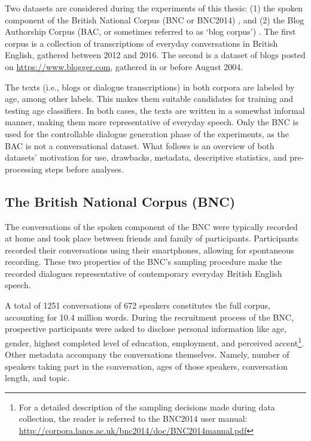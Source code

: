 Two datasets are considered during the experiments of this thesis: (1) the spoken component of the British National Corpus (BNC or BNC2014) \citep{love-spoken-bnc-2014}, and (2) the Blog Authorship Corpus (BAC, or sometimes referred to as `blog corpus') \citep{schler2006effects}. The first corpus is a collection of transcriptions of everyday conversations in British English, gathered between 2012 and 2016. The second is a dataset of blogs posted on \url{https://www.blogger.com}, gathered in or before August 2004.

The texts (i.e., blogs or dialogue transcriptions) in both corpora are labeled by age, among other labels. This makes them suitable candidates for training and testing age classifiers. In both cases, the texts are written in a somewhat informal manner, making them more representative of everyday speech. Only the BNC is used for the controllable dialogue generation phase of the experiments, as the BAC is not a conversational dataset. What follows is an overview of both datasets' motivation for use, drawbacks, metadata, descriptive statistics, and pre-processing steps before analyses. 

\subsection{The British National Corpus (BNC)}
The conversations of the spoken component of the BNC were typically recorded at home and took place between friends and family of participants. Participants recorded their conversations using their smartphones, allowing for spontaneous recording. These two properties of the BNC's sampling procedure make the recorded dialogues representative of contemporary everyday British English speech. 

A total of 1251 conversations of 672 speakers constitutes the full corpus, accounting for 10.4 million words. During the recruitment process of the BNC, prospective participants were asked to disclose personal information like age, gender, highest completed level of education, employment, and perceived accent\footnote{For a detailed description of the sampling decisions made during data collection, the reader is referred to the BNC2014 user manual: \url{http://corpora.lancs.ac.uk/bnc2014/doc/BNC2014manual.pdf}}. Other metadata accompany the conversations themselves. Namely, number of speakers taking part in the conversation, ages of those speakers, conversation length, and topic. 


